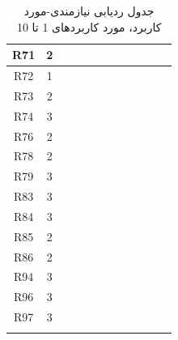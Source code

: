 \documentclass[12pt]{article}
\begin{document}
\begin{longtable}{|c|c|c|c|c|c|c|c|c|c|c|c|}
		\hline
		R71         & 2          &           &           &           &           &           &           &           &           &           &           \\
		\hline
		R72         & 1          &           &           &           &           &           &           &           &           &           &           \\
		\hline
		R73         & 2          &           &           &           &           &           &           &           &           &           &           \\
		\hline
		R74         & 3          &           &           &           &           &           &           &           &           &           &           \\
		\hline
		R76         & 2          &           &           &           &           &           &           &           &           &           &           \\
		\hline
		R78         & 2          &           &           &           &           &           &           &           &           &           &           \\
		\hline
		R79         & 3          &           &           &           &           &           &           &           &           &           &           \\
		\hline
		R83         & 3          &           &           &           &           &           &           &           &           &           &           \\
		\hline
		R84         & 3          &           &           &           &           &           &           &           &           &           &           \\
		\hline
		R85         & 2          &           &           &           &           &           &           &           &           &           &           \\
		\hline
		R86         & 2          &           &           &           &           &           &           &           &           &           &           \\
		\hline
		R94         & 3          &           &           &           &           &           &           &           &           &           &           \\
		\hline
		R96         & 3          &           &           &           &           &           &           &           &           &           &           \\
		\hline
		R97         & 3          &           &           &           &           &           &           &           &           &           &           \\
		\hline
		\caption{جدول ردیابی نیازمندی-مورد کاربرد، مورد کاربردهای 1 تا 10}
	\end{longtable}
\end{document}
